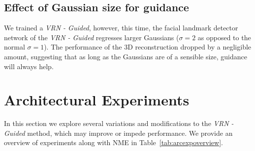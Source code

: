 \subsection{Effect of Gaussian size for guidance} We trained a
\textit{VRN - Guided}, however, this time, the facial landmark
detector network of the \textit{VRN - Guided} regresses larger
Gaussians ($\sigma = 2$ as opposed to the normal $\sigma = 1$). The
performance of the 3D reconstruction dropped by a negligible amount,
suggesting that as long as the Gaussians are of a sensible size,
guidance will always help.

\section{Architectural Experiments}
\label{sec:arcexp}

In this section we explore several variations and modifications to the
\textit{VRN - Guided} method, which may improve or impede
performance. We provide an overview of experiments along with NME in
Table~\ref{tab:arcexpoverview}.

